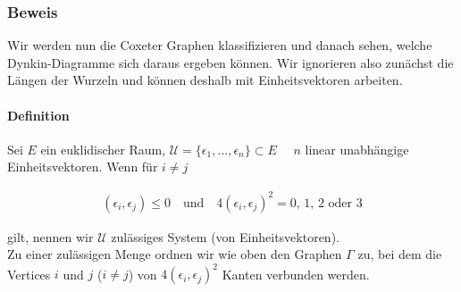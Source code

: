 \documentclass[a4paper,12pt]{article}
\begin{document}
\subsubsection*{Beweis}
Wir werden nun die Coxeter Graphen klassifizieren und danach sehen, welche Dynkin-Diagramme sich daraus ergeben können. Wir ignorieren also zunächst die Längen der Wurzeln und können deshalb mit Einheitsvektoren arbeiten.

\paragraph{Definition}
Sei $E$ ein euklidischer Raum, $\mathcal{U} = \{ \epsilon_1, \ldots, \epsilon_n\} \subset E \quad$ $n$ linear unabhängige Einheitsvektoren. Wenn für $i \neq j$
\begin{framed}
\begin{align*}
(\epsilon_i,\epsilon_j) \leq 0 \quad \text{und} \quad 4(\epsilon_i, \epsilon_j)^2 = 0,\,1,\,2 \text{ oder } 3
\end{align*}
\end{framed}
gilt, nennen wir $\mathcal{U}$ zulässiges System (von Einheitsvektoren).\\
Zu einer zulässigen Menge ordnen wir wie oben den Graphen $\Gamma$ zu, bei dem die Vertices $i$ und $j$ ($i\neq j$) von $4(\epsilon_i,\epsilon_j)^2$ Kanten verbunden werden.
\end{document}
